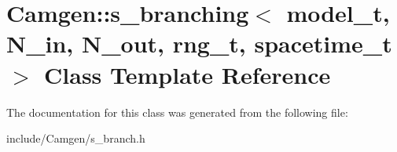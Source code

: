 \hypertarget{a00490}{}\section{Camgen\+:\+:s\+\_\+branching$<$ model\+\_\+t, N\+\_\+in, N\+\_\+out, rng\+\_\+t, spacetime\+\_\+t $>$ Class Template Reference}
\label{a00490}


The documentation for this class was generated from the following file\+:\begin{DoxyCompactItemize}
\item 
include/\+Camgen/s\+\_\+branch.\+h\end{DoxyCompactItemize}
